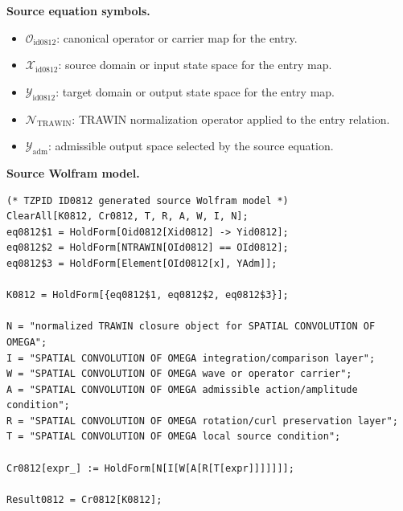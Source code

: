 \begin{minipage}[t]{0.49\linewidth}
\begingroup
\small
\raggedright
\textbf{Source equation symbols.}\par
\begin{itemize}[leftmargin=1.35em,itemsep=1pt,topsep=1pt,parsep=0pt]
    \item $\mathcal{O}_{\mathrm{id0812}}$: canonical operator or carrier map for the entry.
    \item $\mathcal{X}_{\mathrm{id0812}}$: source domain or input state space for the entry map.
    \item $\mathcal{Y}_{\mathrm{id0812}}$: target domain or output state space for the entry map.
    \item $\mathcal{N}_{\mathrm{TRAWIN}}$: TRAWIN normalization operator applied to the entry relation.
    \item $\mathcal{Y}_{\mathrm{adm}}$: admissible output space selected by the source equation.
\end{itemize}
\endgroup
\end{minipage}\hfill
\begin{minipage}[t]{0.47\linewidth}
\begingroup
\scriptsize
\raggedright
\textbf{Source Wolfram model.}\par
\begin{Verbatim}[fontsize=\tiny,breaklines=true,breakanywhere=true]
(* TZPID ID0812 generated source Wolfram model *)
ClearAll[K0812, Cr0812, T, R, A, W, I, N];
eq0812$1 = HoldForm[Oid0812[Xid0812] -> Yid0812];
eq0812$2 = HoldForm[NTRAWIN[OId0812] == OId0812];
eq0812$3 = HoldForm[Element[OId0812[x], YAdm]];

K0812 = HoldForm[{eq0812$1, eq0812$2, eq0812$3}];

N = "normalized TRAWIN closure object for SPATIAL CONVOLUTION OF OMEGA";
I = "SPATIAL CONVOLUTION OF OMEGA integration/comparison layer";
W = "SPATIAL CONVOLUTION OF OMEGA wave or operator carrier";
A = "SPATIAL CONVOLUTION OF OMEGA admissible action/amplitude condition";
R = "SPATIAL CONVOLUTION OF OMEGA rotation/curl preservation layer";
T = "SPATIAL CONVOLUTION OF OMEGA local source condition";

Cr0812[expr_] := HoldForm[N[I[W[A[R[T[expr]]]]]]];

Result0812 = Cr0812[K0812];
\end{Verbatim}
\endgroup
\end{minipage}

